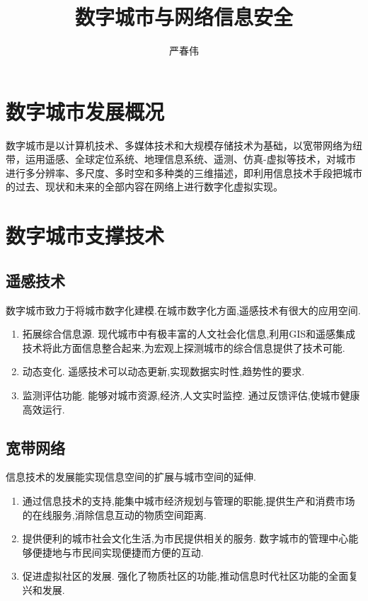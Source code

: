 \documentclass[a4paper]{ctexart}
\author{严春伟}
\title{数字城市与网络信息安全}
\begin{document}
    \maketitle

    \section{数字城市发展概况}
    \par 数字城市是以计算机技术、多媒体技术和大规模存储技术为基础，以宽带网络为纽带，运用遥感、全球定位系统、地理信息系统、遥测、仿真-虚拟等技术，对城市进行多分辨率、多尺度、多时空和多种类的三维描述，即利用信息技术手段把城市的过去、现状和未来的全部内容在网络上进行数字化虚拟实现。 \cite{china-digital-city}

    \section{数字城市支撑技术}
    \subsection{遥感技术}
    \par 数字城市致力于将城市数字化建模.在城市数字化方面,遥感技术有很大的应用空间.
    \begin{enumerate}
        \item 拓展综合信息源. 现代城市中有极丰富的人文社会化信息,利用GIS和遥感集成技术将此方面信息整合起来,为宏观上探测城市的综合信息提供了技术可能.
        \item 动态变化. 遥感技术可以动态更新,实现数据实时性,趋势性的要求.
        \item 监测评估功能. 能够对城市资源,经济,人文实时监控. 通过反馈评估,使城市健康高效运行.
    \end{enumerate}

    \subsection{宽带网络}
    \par 信息技术的发展能实现信息空间的扩展与城市空间的延伸.
    \begin{enumerate}
        \item 通过信息技术的支持,能集中城市经济规划与管理的职能,提供生产和消费市场的在线服务,消除信息互动的物质空间距离.
        \item 提供便利的城市社会文化生活,为市民提供相关的服务. 数字城市的管理中心能够便捷地与市民间实现便捷而方便的互动.
        \item 促进虚拟社区的发展. 强化了物质社区的功能,推动信息时代社区功能的全面复兴和发展.
    \end{enumerate}
\end{document}
